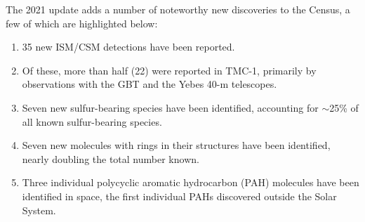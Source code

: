 \documentclass[twocolumn]{aastex631}
\newcommand{\update}[1]{{#1}}
\begin{document}
\update{{The 2021 update adds a number of noteworthy new discoveries to the Census, a few of which are highlighted below:}}

\begin{enumerate}
	\item \update{{35 new ISM/CSM detections have been reported.}}
	\item \update{{Of these, more than half (22) were reported in TMC-1, primarily by observations with the GBT and the Yebes 40-m telescopes.}}
	\item \update{{Seven new sulfur-bearing species have been identified, accounting for $\sim$25\% of all known sulfur-bearing species.}}  
	\item \update{{Seven new molecules with rings in their structures have been identified, nearly doubling the total number known.}}
	\item \update{{Three individual polycyclic aromatic hydrocarbon (PAH) molecules have been identified in space, the first individual PAHs discovered outside the Solar System.}}
\end{enumerate}





	
	
	
	
\end{document}
